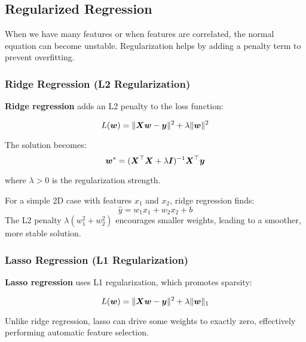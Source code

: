 \subsection{Regularized Regression}

When we have many features or when features are correlated, the normal equation can become unstable. Regularization helps by adding a penalty term to prevent overfitting.

\subsubsection{Ridge Regression (L2 Regularization)}

\textbf{Ridge regression} adds an L2 penalty to the loss function:

\begin{equation}
L(\boldsymbol{w}) = \|\boldsymbol{X}\boldsymbol{w} - \boldsymbol{y}\|^2 + \lambda \|\boldsymbol{w}\|^2
\end{equation}

The solution becomes:
\begin{equation}
\boldsymbol{w}^* = (\boldsymbol{X}^\top \boldsymbol{X} + \lambda \boldsymbol{I})^{-1} \boldsymbol{X}^\top \boldsymbol{y}
\end{equation}

where $\lambda > 0$ is the regularization strength.

\begin{example}
For a simple 2D case with features $x_1$ and $x_2$, ridge regression finds:
$$\hat{y} = w_1 x_1 + w_2 x_2 + b$$
The L2 penalty $\lambda(w_1^2 + w_2^2)$ encourages smaller weights, leading to a smoother, more stable solution.
\end{example}

\subsubsection{Lasso Regression (L1 Regularization)}

\textbf{Lasso regression} uses L1 regularization, which promotes sparsity:

\begin{equation}
L(\boldsymbol{w}) = \|\boldsymbol{X}\boldsymbol{w} - \boldsymbol{y}\|^2 + \lambda \|\boldsymbol{w}\|_1
\end{equation}

Unlike ridge regression, lasso can drive some weights to exactly zero, effectively performing automatic feature selection.


